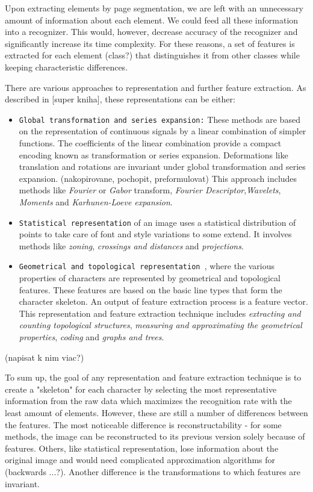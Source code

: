 Upon extracting elements by page segmentation, we are left with an unnecessary amount of information about each element. We could feed all these information into a recognizer. This would, however, decrease accuracy of the recognizer and significantly increase its time complexity. For these reasons, a set of features is extracted for each element (class?) that distinguishes it from other classes while keeping characteristic differences.

There are various approaches to representation and further feature extraction. As described in [super kniha], these representations can be either:
\begin{itemize}

\item\texttt{Global transformation and series expansion:} These methods are based on the representation of continuous signals by a linear combination of simpler functions. The coefficients of the linear combination provide a compact encoding known as transformation or series expansion. Deformations like translation and rotations are invariant under global transformation and series expansion. (nakopirovane, pochopit, preformulovat)
This approach includes methods like \emph{Fourier} or \emph{Gabor} transform, \emph{Fourier Descriptor},\emph{Wavelets}, \emph{Moments} and \emph{Karhunen-Loeve expansion}.

\item\texttt{Statistical representation} of an image uses a statistical distribution of points to take care of font and style variations to some extend. It involves methods like \emph{zoning}, \emph{crossings and distances} and \emph{projections}.

\item\texttt{Geometrical and topological representation }, where the various properties of characters are represented by geometrical and topological features. These features are based on the basic line types that form the character skeleton. An output of feature extraction process is a feature vector. This representation and feature extraction technique includes \emph{extracting and counting topological structures}, \emph{measuring and approximating the geometrical properties}, \emph{coding} and \emph{graphs and trees}.


\end{itemize}

(napisat k nim viac?)

To sum up, the goal of any representation and feature extraction technique is to create a "skeleton" for each character by selecting the most representative information from the raw data which maximizes the recognition rate with the least amount of elements. However, these are still a number of differences between the features. The most noticeable difference is reconstructability - for some methods, the image can be reconstructed to its previous version solely because of features. Others, like statistical representation, lose information about the original image and would need complicated approximation algorithms for (backwards ...?). Another difference is the transformations to which features are invariant.

